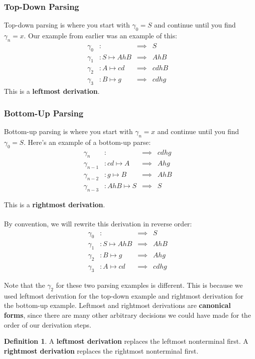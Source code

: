 \documentclass[]{article}
\theoremstyle{definition}
\newtheorem*{defn}{Definition}
\begin{document}
			\subsubsection{Top-Down Parsing}
				Top-down parsing is where you start with $\gamma_0 = S$ and continue until you find $\gamma_n = x$. Our example from earlier was an example of this:
				\begin{align*}
					\gamma_0&: &\implies& S \\
					\gamma_1&: S \mapsto AhB &\implies& AhB \\
					\gamma_2&: A \mapsto cd &\implies& cdhB \\
					\gamma_3&: B \mapsto g &\implies& cdhg
				\end{align*}
				This is a \textbf{leftmost derivation}.

			\subsubsection{Bottom-Up Parsing}
				Bottom-up parsing is where you start with $\gamma_n = x$ and continue until you find $\gamma_0 = S$. Here's an example of a bottom-up parse:
				\begin{align*}
					\gamma_n&: &\implies& cdhg \\
					\gamma_{n - 1}&: cd \mapsto A &\implies& Ahg \\
					\gamma_{n - 2}&: g \mapsto B &\implies& AhB \\
					\gamma_{n - 3}&: AhB \mapsto S &\implies& S 
				\end{align*}

				This is a \textbf{rightmost derivation}.
				\\ \\
				By convention, we will rewrite this derivation in reverse order:
				\begin{align*}
					\gamma_0&: &\implies& S \\
					\gamma_1&: S \mapsto AhB &\implies& AhB \\
					\gamma_2&: B \mapsto g &\implies& Ahg \\
					\gamma_3&: A \mapsto cd &\implies& cdhg
				\end{align*}

				Note that the $\gamma_2$ for these two parsing examples is different. This is because we used leftmost derivation for the top-down example and rightmost derivation for the bottom-up example. Leftmost and rightmost derivations are \textbf{canonical forms}, since there are many other arbitrary decisions we could have made for the order of our derivation steps.
				\begin{defn}
					A \textbf{leftmost derivation} replaces the leftmost nonterminal first. A \textbf{rightmost derivation} replaces the rightmost nonterminal first.
				\end{defn}
\end{document}
